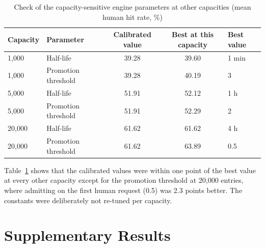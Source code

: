 \begin{table}[htbp]
    \centering
    \caption{Check of the capacity-sensitive engine parameters at other capacities (mean human hit rate, \%)}
    \label{tab:app-capacity-check}
    \small
    \begin{tabular}{llccl}
        \toprule
        Capacity & Parameter & Calibrated value & Best at this capacity & Best value \\
        \midrule
        1{,}000 & Half-life & 39.28 & 39.60 & 1 min \\
        1{,}000 & Promotion threshold & 39.28 & 40.19 & 3 \\
        5{,}000 & Half-life & 51.91 & 52.12 & 1 h \\
        5{,}000 & Promotion threshold & 51.91 & 52.29 & 2 \\
        20{,}000 & Half-life & 61.62 & 61.62 & 4 h \\
        20{,}000 & Promotion threshold & 61.62 & 63.89 & 0.5 \\
        \bottomrule
    \end{tabular}
\end{table}

Table~\ref{tab:app-capacity-check} shows that the calibrated values were within one point of the best value at every other capacity except for the promotion threshold at 20{,}000 entries, where admitting on the first human request (0.5) was 2.3 points better. The constants were deliberately not re-tuned per capacity.

\section{Supplementary Results}

